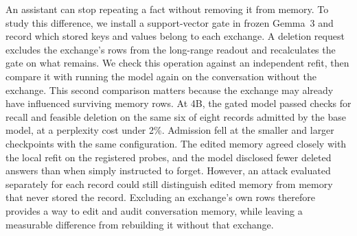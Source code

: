 An assistant can stop repeating a fact without removing it from memory.
To study this difference, we install a support-vector gate in frozen
Gemma~3 and record which stored keys and values belong to each exchange.
A deletion request excludes the exchange's rows from the long-range readout
and recalculates the gate on what remains. We check this operation against
an independent refit, then compare it with running the model again on the
conversation without the exchange. This second comparison matters because
the exchange may already have influenced surviving memory rows.
At 4B, the gated model passed checks for recall and feasible deletion on the
same six of eight records admitted by the base model, at a perplexity cost
under 2\%. Admission fell at the smaller and larger
checkpoints with the same configuration. The edited memory agreed closely
with the local refit on the registered probes, and the model disclosed fewer
deleted answers than when simply instructed to forget. However, an attack
evaluated separately for each record could still distinguish edited memory
from memory that never stored the record. Excluding an exchange's own rows
therefore provides a way to edit and audit conversation memory, while leaving
a measurable difference from rebuilding it without that exchange.
